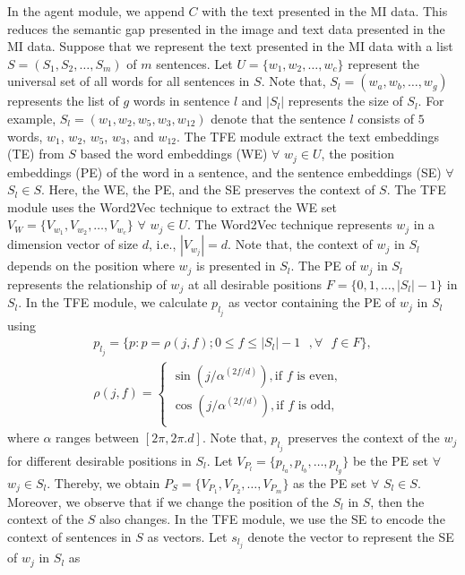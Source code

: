 \documentclass[preprint,review,12pt]{elsarticle}
\begin{document}
In the agent module, we append $C$ with the text presented in the MI data. This reduces the semantic gap presented in the image and text data presented in the MI data. Suppose that we represent the text presented in the MI data with a list $S = (S_1, S_2, \ldots, S_m)$ of $m$ sentences. Let $U=\{w_1, w_2, \ldots, w_c\}$ represent the universal set of all words for all sentences in $S$. Note that,  $S_l = (w_a, w_b, \ldots, w_g) $ represents the list of $g$ words in sentence $l$ and $|S_l|$ represents the size of $S_l$. For example, $S_l = (w_1, w_2, w_5, w_3, w_{12})$ denote that the sentence $l$ consists of $5$ words, $w_1$, $w_2$, $w_5$, $w_3$, and $w_{12}$. The TFE module extract the text embeddings (TE) from $S$ based the word embeddings (WE) $\forall$ $w_j \in U$, the position embeddings (PE) of the word in a sentence, and the sentence embeddings (SE) $\forall$ $S_l \in S$. Here, the WE, the PE, and the SE preserves the context of $S$. The TFE module uses the Word2Vec technique to extract the WE set $V_W = \{V_{w_1}, V_{w_2}, \ldots, V_{w_c}\}$ $\forall$ $w_j \in U$. The Word2Vec technique represents $w_j$ in a dimension vector of size $d$, i.e., $|V_{w_j}| = d$. Note that, the context of $w_j$ in $S_l$ depends on the position where $w_j$ is presented in $S_l$. The PE of $w_j$ in $S_l$ represents the relationship of $w_j$ at all desirable positions $F = \{0, 1, \dots, |S_l|-1\}$ in $S_l$.  In the TFE module, we calculate $p_{l_j}$ as vector containing the PE of $w_j$ in $S_l$ using
\begin{equation}  \label{eq1}
	\begin{aligned}
	p_{l_j} = \{ p: p = \rho(j,f); 0 \le f\le |S_l|-1 \text{  },  \forall \text{  }  f\in F\}, \\
	\rho(j,f)=
		\begin{cases}
			\sin(j / \alpha ^ {(2f/d)}), \text {if $f$ is even}, \\
			\cos(j / \alpha ^ {(2f/d)}), \text {if $f$ is odd},\\
		\end{cases}
	\end{aligned}
\end{equation}
where $\alpha$ ranges between $[2\pi, 2\pi.d]$. Note that, $p_{l_j}$ preserves the context of the $w_j$ for different desirable positions in $S_l$. Let $V_{P_l} = \{p_{l_a}, p_{l_b}, \ldots, p_{l_g}\}$ be the PE set $\forall$ $w_j \in S_l$. Thereby, we obtain $P_S = \{V_{P_1}, V_{P_2}, \ldots, V_{P_m}\}$ as the PE set $\forall$ $S_l \in S$. Moreover, we observe that if we change the position of the $S_l$ in $S$, then the context of the $S$ also changes. In the TFE module, we use the SE to encode the context of sentences in $S$ as vectors. Let $s_{l_j}$ denote the vector to represent the SE of $w_j$ in $S_l$ as 
\end{document}

